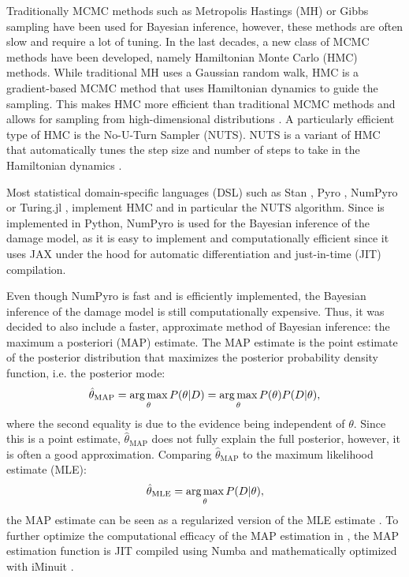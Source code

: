 Traditionally MCMC methods such as Metropolis Hastings (MH) or Gibbs sampling have been used for Bayesian inference, however, these methods are often slow and require a lot of tuning. In the last decades, a new class of MCMC methods have been developed, namely Hamiltonian Monte Carlo (HMC) methods. While traditional MH uses a Gaussian random walk, HMC is a gradient-based MCMC method that uses Hamiltonian dynamics to guide the sampling. This makes HMC more efficient than traditional MCMC methods and allows for sampling from high-dimensional distributions \autocite{betancourtConceptualIntroductionHamiltonian2018,nealMCMCUsingHamiltonian2011}. A particularly efficient type of HMC is the No-U-Turn Sampler (NUTS). NUTS is a variant of HMC that automatically tunes the step size and number of steps to take in the Hamiltonian dynamics \autocite{homanNoUturnSamplerAdaptively2014}.

Most statistical domain-specific languages (DSL) such as Stan \autocite{carpenterStanProbabilisticProgramming2017}, Pyro \autocite{binghamPyroDeepUniversal2019}, NumPyro \autocite{phanComposableEffectsFlexible2019} or Turing.jl \autocite{geTuringLanguageFlexible2018}, implement HMC and in particular the NUTS algorithm. Since \metaDMG is implemented in Python, NumPyro is used for the Bayesian inference of the damage model, as it is easy to implement and computationally efficient since it uses JAX \autocite{bradburyJAXComposableTransformations2018} under the hood for automatic differentiation and just-in-time (JIT) compilation.

Even though NumPyro is fast and \metaDMG is efficiently implemented, the Bayesian inference of the damage model is still computationally expensive. Thus, it was decided to also include a faster, approximate method of Bayesian inference: the maximum a posteriori (MAP) estimate. The MAP estimate is the point estimate of the posterior distribution that maximizes the posterior probability density function, i.e. the posterior mode:
\begin{align}
    \hat{\theta}_\mathrm{MAP} = \operatorname*{arg\,max}_\theta P(\theta|D) = \operatorname*{arg\,max}_\theta P(\theta)P(D|\theta),
\end{align}
where the second equality is due to the evidence being independent of $\theta$. Since this is a point estimate, $\hat{\theta}_\mathrm{MAP}$ does not fully explain the full posterior, however, it is often a good approximation. Comparing $\hat{\theta}_\mathrm{MAP}$ to the maximum likelihood estimate (MLE):
\begin{align}
    \hat{\theta}_\mathrm{MLE} = \operatorname*{arg\,max}_\theta P(D|\theta),
\end{align}
the MAP estimate can be seen as a regularized version of the MLE estimate \autocite{murphyMachineLearningProbabilistic2012}. To further optimize the computational efficacy of the MAP estimation in \metaDMG, the MAP estimation function is JIT compiled using Numba \autocite{lamNumbaLLVMbasedPython2015} and mathematically optimized with iMinuit \autocite{dembinskiScikithepIminuitV22021}.

